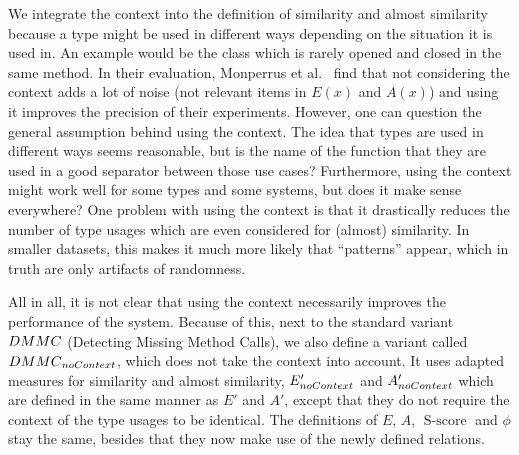 We integrate the context into the definition of similarity and almost similarity because a type might be used in different ways depending on the situation it is used in.
An example would be the class  which is rarely opened and closed in the same method.
In their evaluation, Monperrus et al.~\cite{monperrus2013detecting} find that not considering the context adds a lot of noise (not relevant items in $E(x)$ and $A(x)$) and using it improves the precision of their experiments.
However, one can question the general assumption behind using the context.
The idea that types are used in different ways seems reasonable, but is the name of the function that they are used in a good separator between those use cases?
Furthermore, using the context might work well for some types and some systems, but does it make sense everywhere?
One problem with using the context is that it drastically reduces the number of type usages which are even considered for (almost) similarity.
In smaller datasets, this makes it much more likely that ``patterns'' appear, which in truth are only artifacts of randomness.

All in all, it is not clear that using the context necessarily improves the performance of the system.
Because of this, next to the standard variant $\mathnormal{DMMC}$ (Detecting Missing Method Calls), we also define a variant called $\mathnormal{DMMC}_{\mathnormal{noContext}}$, which does not take the context into account.
It uses adapted measures for similarity and almost similarity, $E'_{\mathnormal{noContext}}$ and $A'_{\mathnormal{noContext}}$ which are defined in the same manner as $E'$ and $A'$, except that they do not require the context of the type usages to be identical.
The definitions of $E$, $A$, $\operatorname{S-score}$ and $\phi$ stay the same, besides that they now make use of the newly defined relations.


